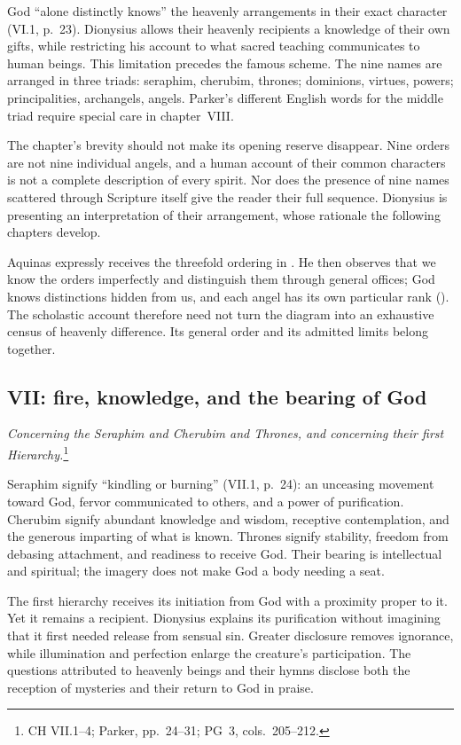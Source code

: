 God ``alone distinctly knows'' the heavenly arrangements in their exact character (VI.1, p.~23). Dionysius allows their heavenly recipients a knowledge of their own gifts, while restricting his account to what sacred teaching communicates to human beings. This limitation precedes the famous scheme. The nine names are arranged in three triads: seraphim, cherubim, thrones; dominions, virtues, powers; principalities, archangels, angels. Parker's different English words for the middle triad require special care in chapter~VIII.

The chapter's brevity should not make its opening reserve disappear. Nine orders are not nine individual angels, and a human account of their common characters is not a complete description of every spirit. Nor does the presence of nine names scattered through Scripture itself give the reader their full sequence. Dionysius is presenting an interpretation of their arrangement, whose rationale the following chapters develop.

Aquinas expressly receives the threefold ordering in . He then observes that we know the orders imperfectly and distinguish them through general offices; God knows distinctions hidden from us, and each angel has its own particular rank (). The scholastic account therefore need not turn the diagram into an exhaustive census of heavenly difference. Its general order and its admitted limits belong together.

\subsection{VII: fire, knowledge, and the bearing of God}
\emph{Concerning the Seraphim and Cherubim and Thrones, and concerning their first Hierarchy.}\footnote{CH VII.1--4; Parker, pp.~24--31; PG~3, cols.~205--212.}

Seraphim signify ``kindling or burning'' (VII.1, p.~24): an unceasing movement toward God, fervor communicated to others, and a power of purification. Cherubim signify abundant knowledge and wisdom, receptive contemplation, and the generous imparting of what is known. Thrones signify stability, freedom from debasing attachment, and readiness to receive God. Their bearing is intellectual and spiritual; the imagery does not make God a body needing a seat.

The first hierarchy receives its initiation from God with a proximity proper to it. Yet it remains a recipient. Dionysius explains its purification without imagining that it first needed release from sensual sin. Greater disclosure removes ignorance, while illumination and perfection enlarge the creature's participation. The questions attributed to heavenly beings and their hymns disclose both the reception of mysteries and their return to God in praise.


